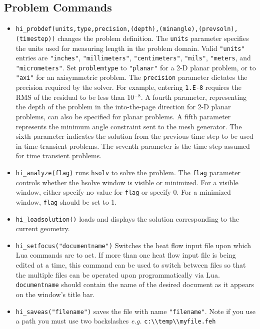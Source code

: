 \subsection{Problem Commands}

\begin{itemize}
\item {\tt hi\_probdef(units,type,precision,(depth),(minangle),(prevsoln),(timestep))} changes the problem
definition. The \texttt{units} parameter specifies the units used
for measuring length in the problem domain. Valid \texttt{"units"}
entries are
\texttt{"inches"}, \texttt{"millimeters"}, \texttt{"centimeters"},
\texttt{"mils"}, \texttt{"meters}, and \texttt{"micrometers"}. Set
\texttt{problemtype} to \texttt{"planar"} for a 2-D planar problem, or to
\texttt{"axi"} for an axisymmetric problem. The \texttt{precision} parameter
dictates the precision required by the solver. For example, entering
\texttt{1.E-8} requires the RMS of the residual to be less than 10$^{ - 8}$.
A fourth parameter, representing the depth of the problem in the
into-the-page direction for 2-D planar problems, can also be specified
for planar problems. A fifth parameter represents the minimum angle constraint sent to the mesh generator.
The sixth parameter indicates the solution from the previous time step
to be used in time-transient problems. The seventh parameter is the time step assumed
for time transient problems.

\item {\tt hi\_analyze(flag)} runs \texttt{hsolv} to solve the problem. The
\texttt{flag} parameter controls whether the hsolve window is visible or
minimized. For a visible window, either specify no value for
\texttt{flag} or specify 0. For a minimized window, \texttt{flag}
should be set to 1.

\item {\tt hi\_loadsolution()} loads and displays the solution corresponding to the
current geometry.

\item {\tt hi\_setfocus("documentname")} Switches the
heat flow input file upon which Lua commands are to act. If
more than one heat flow input file is being edited at a time,
this command can be used to switch between files so that the
multiple files can be operated upon programmatically via Lua. {\tt
documentname} should contain the name of the desired document as
it appears on the window's title bar.

\item {\tt hi\_saveas("filename")} saves the file with name
\texttt{"filename"}. Note if you use a path you must use two backslashes
{\em e.g.} \verb+c:\\temp\\myfile.feh+

\end{itemize}

